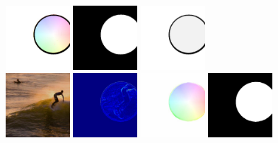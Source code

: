     \includegraphics[width=0.18\textwidth]{ch-tomnet/images/Synth/synthetic_15_shape000449828_gt_fcolor.jpg}
    \includegraphics[width=0.18\textwidth]{ch-tomnet/images/Synth/synthetic_15_shape0000_COCO_val2014_000000449828_gt_mask}
    \includegraphics[width=0.18\textwidth]{ch-tomnet/images/Synth/synthetic_15_shape0000_COCO_val2014_000000449828_gt_rho}
    \\
    \includegraphics[width=0.18\textwidth]{ch-tomnet/images/Synth/synthetic_15_shape0000_COCO_val2014_000000449828_ref.jpg}
    \includegraphics[width=0.18\textwidth]{ch-tomnet/images/Synth/synthetic_15_shape000449828_PSNR_31.01_SSIM_0.92_.jpg}
    \includegraphics[width=0.18\textwidth]{ch-tomnet/images/Synth/synthetic_15_shape0000_COCO_val2014_000000449828_fcolor.jpg}
    \includegraphics[width=0.18\textwidth]{ch-tomnet/images/Synth/synthetic_15_shape0000_COCO_val2014_000000449828_mask.png}

